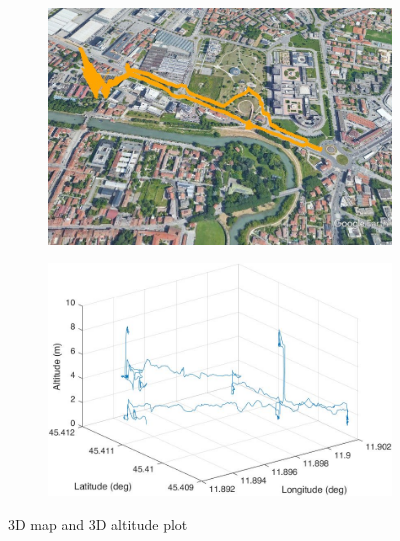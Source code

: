 \begin{figure}[h!]
    \centering
    \begin{subfigure}[b]{0.45\textwidth}
        \centering
        \includegraphics[width=\textwidth]{images/flight-data/3d-map.jpg}
        \caption{}
        \label{fig:3d-map}
    \end{subfigure}
    \hfill
    \begin{subfigure}[b]{0.45\textwidth}
        \centering
        \includegraphics[width=\textwidth]{images/flight-data/raspberry/ALT_3D_R.jpg}
        \caption{}
        \label{fig:testflight-alt}
    \end{subfigure}
       \caption{3D map and 3D altitude plot}
       \label{fig:testflight-telemetry}
\end{figure}

